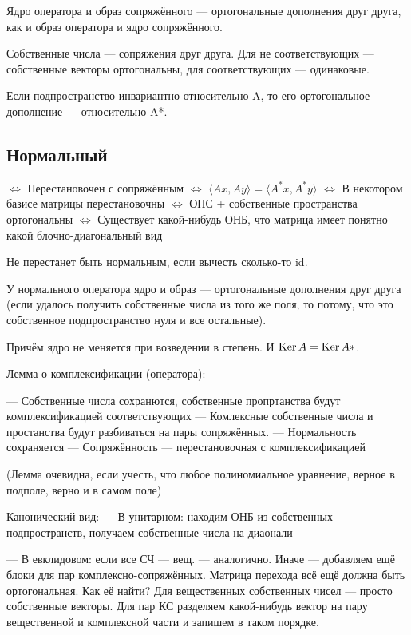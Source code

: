 \documentclass[12pt, a4paper]{article}
\begin{document}
    Ядро оператора и образ сопряжённого — ортогональные дополнения друг друга, как и образ оператора и ядро сопряжённого.


    Собственные числа — сопряжения друг друга.
    Для не соответствующих — собственные векторы ортогональны, для соответствующих — одинаковые.

    Если подпространство инвариантно относительно A, то его ортогональное дополнение — относительно A*.


    \subsection{Нормальный}

    $\Longleftrightarrow$ Перестановочен с сопряжённым 
    $\Longleftrightarrow$ $\langle A x, A y \rangle = \langle A^* x, A^* y \rangle$ 
    $\Longleftrightarrow$ В некотором базисе матрицы перестановочны
    $\Longleftrightarrow$ ОПС + собственные пространства ортогональны 
    $\Longleftrightarrow$ Существует какой-нибудь ОНБ, что матрица имеет понятно какой блочно-диагональный вид


    Не перестанет быть нормальным, если вычесть сколько-то id.

    У нормального оператора ядро и образ — ортогональные дополнения друг друга (если удалось получить собственные числа из того же поля, то потому, что это собственное подпространство нуля и все остальные).

    Причём ядро не меняется при возведении в степень. И $\operatorname{Ker} A = \operatorname{Ker} A*$.

    Лемма о комплексификации (оператора):

    — Собственные числа сохранются, собственные пропртанства будут комплексификацией соответствующих
    — Комлексные собственные числа и простанства будут разбиваться на пары сопряжённых.
    — Нормальность сохраняется
    — Сопряжённость — перестановочная с комплексификацией

    (Лемма очевидна, если учесть, что любое полиномиальное уравнение, верное в подполе, верно и в самом поле)


    Канонический вид:
    — В унитарном: находим ОНБ из собственных подпространств, получаем собственные числа на диаонали
    
    — В евклидовом: если все СЧ — вещ. — аналогично. Иначе — добавляем ещё блоки для пар комплексно-сопряжённых.
    Матрица перехода всё ещё должна быть ортогональная. Как её найти? Для вещественных собственных чисел — просто собственные векторы. 
    Для пар КС разделяем какой-нибудь вектор на пару вещественной и комплексной части и запишем в таком порядке.
\end{document}
